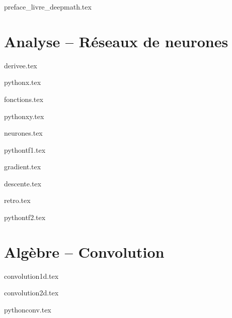 \documentclass[11pt]{report}
\begin{document}
\renewcommand{\contentsname}{Sommaire}

{preface_livre_deepmath.tex}
\debutchapitres
{}


\clearemptydoublepage


\part{Analyse -- Réseaux de neurones}

{derivee.tex}

{pythonx.tex}

{fonctions.tex}

{pythonxy.tex}

{neurones.tex}

{pythontf1.tex}

{gradient.tex}

{descente.tex}

{retro.tex}

{pythontf2.tex}



\part{Algèbre -- Convolution}

{convolution1d.tex}

{convolution2d.tex}

{pythonconv.tex}
\end{document}
